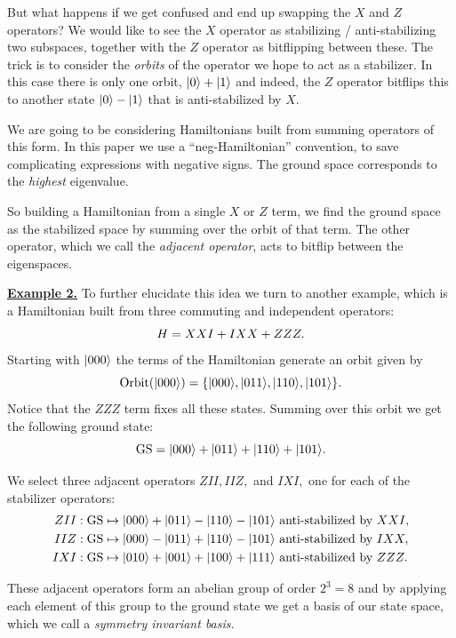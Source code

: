 But what happens if we get confused and end up swapping
the $X$ and $Z$ operators? We would like to see the $X$ operator
as stabilizing / anti-stabilizing two subspaces, together with the
$Z$ operator as bitflipping between these.
The trick is to consider the \emph{orbits} of the operator
we hope to act as a stabilizer.
In this case there is only one orbit, $|{0}\rangle+|{1}\rangle$
and indeed, the $Z$ operator bitflips this to another state
$|{0}\rangle-|{1}\rangle$ that is anti-stabilized by $X.$

We are going to be considering Hamiltonians built from
summing operators of this form.
In this paper we use a ``neg-Hamiltonian'' convention,
to save complicating expressions with negative signs.
The ground space corresponds to the \emph{highest} eigenvalue.

So building a Hamiltonian from a single $X$ or $Z$ term,
we find the ground space as the stabilized space
by summing over the orbit of that term.
The other operator,
which we call the \emph{adjacent operator}, acts to bitflip
between the eigenspaces.

\underline{\bf Example 2.}
To further elucidate this idea we turn to another example,
which is a Hamiltonian built from three commuting and
independent operators:
$$
    H = XXI + IXX + ZZZ.
$$
Starting with $|{000}\rangle$
the terms of the Hamiltonian generate an orbit
given by $$\mathrm{Orbit}(|{000}\rangle) = \{|{000}\rangle, |{011}\rangle, |{110}\rangle, |{101}\rangle\}.$$
Notice that the $ZZZ$ term fixes all these states.
Summing over this orbit we get the following ground state:
$$\mathrm{GS} = |{000}\rangle+|{011}\rangle+|{110}\rangle+|{101}\rangle.$$

We select three adjacent operators
$ZII, IIZ,$ and $IXI,$
one for each of the stabilizer operators:
\begin{align*}
    ZII : \mbox{GS} &\mapsto |{000}\rangle+|{011}\rangle-|{110}\rangle-|{101}\rangle 
        \ \mbox{anti-stabilized by}\  XXI,\\
    IIZ : \mbox{GS} &\mapsto |{000}\rangle-|{011}\rangle+|{110}\rangle-|{101}\rangle 
        \ \mbox{anti-stabilized by}\  IXX,\\
    IXI : \mbox{GS} &\mapsto |{010}\rangle+|{001}\rangle+|{100}\rangle+|{111}\rangle 
        \ \mbox{anti-stabilized by}\  ZZZ.
\end{align*}

These adjacent operators form an abelian group
of order $2^3 = 8$ and by applying each element of
this group to the ground state we get a basis
of our state space, which we call a \emph{symmetry
invariant basis.}


